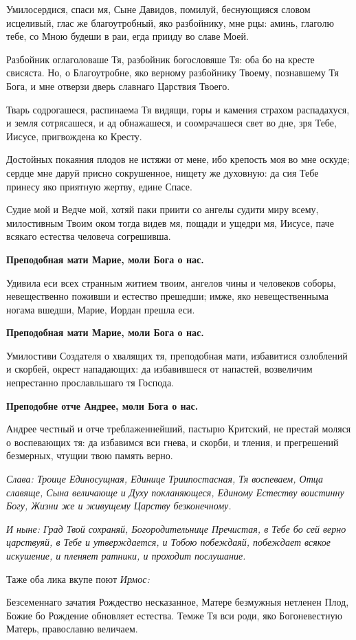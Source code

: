 Умилосердися, спаси мя, Сыне Давидов, помилуй, беснующияся словом исцеливый, глас же благоутробный, яко разбойнику, мне рцы: аминь, глаголю тебе, со Мною будеши в раи, егда прииду во славе Моей.


Разбойник оглаголоваше Тя, разбойник богословяше Тя: оба бо на кресте свисяста. Но, о Благоутробне, яко верному разбойнику Твоему, познавшему Тя Бога, и мне отверзи дверь славнаго Царствия Твоего.


Тварь содрогашеся, распинаема Тя видящи, горы и камения страхом распадахуся, и земля сотрясашеся, и ад обнажашеся, и соомрачашеся свет во дне, зря Тебе, Иисусе, пригвождена ко Кресту.


Достойных покаяния плодов не истяжи от мене, ибо крепость моя во мне оскуде; сердце мне даруй присно сокрушенное, нищету же духовную: да сия Тебе принесу яко приятную жертву, едине Спасе.


Судие мой и Ведче мой, хотяй паки приити со ангелы судити миру всему, милостивным Твоим оком тогда видев мя, пощади и ущедри мя, Иисусе, паче всякаго естества человеча согрешивша.


\bfseries Преподобная мати Марие, моли Бога о нас.\normalfont{}


Удивила еси всех странным житием твоим, ангелов чины и человеков соборы, невещественно поживши и естество прешедши; имже, яко невещественныма ногама вшедши, Марие, Иордан прешла еси.


\bfseries Преподобная мати Марие, моли Бога о нас.\normalfont{}


Умилостиви Создателя о хвалящих тя, преподобная мати, избавитися озлоблений и скорбей, окрест нападающих: да избавившеся от напастей, возвеличим непрестанно прославльшаго тя Господа.


\bfseries Преподобне отче Андрее, моли Бога о нас.\normalfont{}


Андрее честный и отче треблаженнейший, пастырю Критский, не престай моляся о воспевающих тя: да избавимся вси гнева, и скорби, и тления, и прегрешений безмерных, чтущии твою память верно.


\itshape Слава\normalfont{}: Троице Единосущная, Единице Триипостасная, Тя воспеваем, Отца славяще, Сына величающе и Духу покланяющеся, Единому Естеству воистинну Богу, Жизни же и живущему Царству безконечному.


\itshape И ныне\normalfont{}: Град Твой сохраняй, Богородительнице Пречистая, в Тебе бо сей верно царствуяй, в Тебе и утверждается, и Тобою побеждаяй, побеждает всякое искушение, и пленяет ратники, и проходит послушание.


Таже оба лика вкупе поют \itshape Ирмос\normalfont{}:


Безсеменнаго зачатия Рождество несказанное, Матере безмужныя нетленен Плод, Божие бо Рождение обновляет естества. Темже Тя вси роди, яко Богоневестную Матерь, православно величаем.

\bigskip\bigskip\mychapterending
